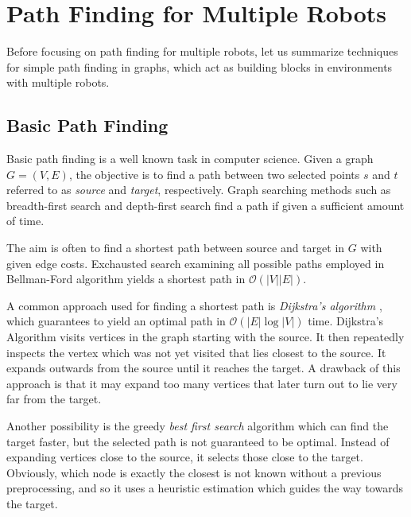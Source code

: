 \chapter{Path Finding for Multiple Robots}\label{sec:app}


Before focusing on path finding for multiple robots, let us summarize techniques for simple path finding in graphs, which act as building blocks in environments with multiple robots.

\section{Basic Path Finding}

Basic path finding is a well known task in computer science.
Given a graph $G=(V,E)$, the objective is to find a path between two selected points $s$ and $t$ referred to as  \emph{source} and \emph{target}, respectively.
Graph searching methods such as breadth-first search and depth-first search find a path if given a sufficient amount of time. 

The aim is often to find a shortest path between source and target in $G$ with given edge costs.
Exchausted search examining all possible paths employed in Bellman-Ford algorithm yields a shortest path in $\mathcal{O}(|V||E|)$.

A common approach used for finding a shortest path is \emph{Dijkstra's algorithm} \cite{dijkstra59}, which guarantees to yield an optimal path in $\mathcal{O}(|E|\log|V|)$ time.
Dijkstra’s Algorithm visits vertices in the graph starting with the source. 
It then repeatedly inspects the vertex which was not yet visited that lies closest to the source. 
It expands outwards from the source until it reaches the target. 
A drawback of this approach is that it may expand too many vertices that later turn out to lie very far from the target.

Another possibility is the greedy \emph{best first search} algorithm which can find the target faster, but the selected path is not guaranteed to be optimal.
Instead of expanding vertices close to the source, it selects those close to the target.
Obviously, which node is exactly the closest is not known without a previous preprocessing, and so it uses a heuristic estimation which guides the way towards the target.

